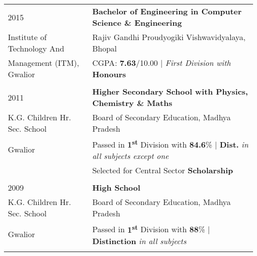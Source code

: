 \documentclass[a4paper,10pt]{article} %
\begin{document}
\begin{tabular}{ll}	
2015 & \textbf{Bachelor of Engineering in Computer Science \& Engineering}\\
Institute of Technology And & Rajiv Gandhi Proudyogiki Vishwavidyalaya, Bhopal\\
Management (ITM), Gwalior &\normalsize \textsc{CGPA}: \textbf{7.63}/10.00 | \small\emph{First Division with} \textbf{Honours}\\
&\\


2011 & \textbf{Higher Secondary School with Physics, Chemistry \& Maths} \\
K.G. Children Hr. Sec. School & Board of Secondary Education, Madhya Pradesh\\
Gwalior & Passed in \textbf{1\textsuperscript{st}} Division with \textbf{84.6}\% | \textbf{Dist.} \small\emph{in all subjects except one}\\
& Selected for Central Sector \textbf{Scholarship}\\
&\\


2009 & \textbf{High School}\\
K.G. Children Hr. Sec. School & Board of Secondary Education, Madhya Pradesh\\
Gwalior & Passed in \textbf{1\textsuperscript{st}} Division with \textbf{88}\% | \textbf{Distinction} \small\emph{in all subjects}\\
&\\
\end{tabular}


%
%
%
\end{document}
